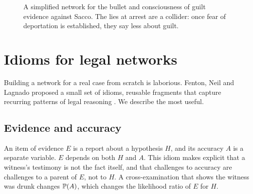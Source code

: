 \begin{figure}[t]
\centering
{}
\caption{A simplified network for the bullet and consciousness of guilt evidence against Sacco. The lies at arrest are a collider: once fear of deportation is established, they say less about guilt.}
\label{fig:sacco}
\end{figure}

\section{Idioms for legal networks}

Building a network for a real case from scratch is laborious. Fenton, Neil and Lagnado proposed a small set of idioms, reusable fragments that capture recurring patterns of legal reasoning \citep{fenton2013}. We describe the most useful.

\subsection{Evidence and accuracy}

An item of evidence $E$ is a report about a hypothesis $H$, and its accuracy $A$ is a separate variable. $E$ depends on both $H$ and $A$. This idiom makes explicit that a witness's testimony is not the fact itself, and that challenges to accuracy are challenges to a parent of $E$, not to $H$. A cross-examination that shows the witness was drunk changes $\mathbb{P}(A)$, which changes the likelihood ratio of $E$ for $H$.

